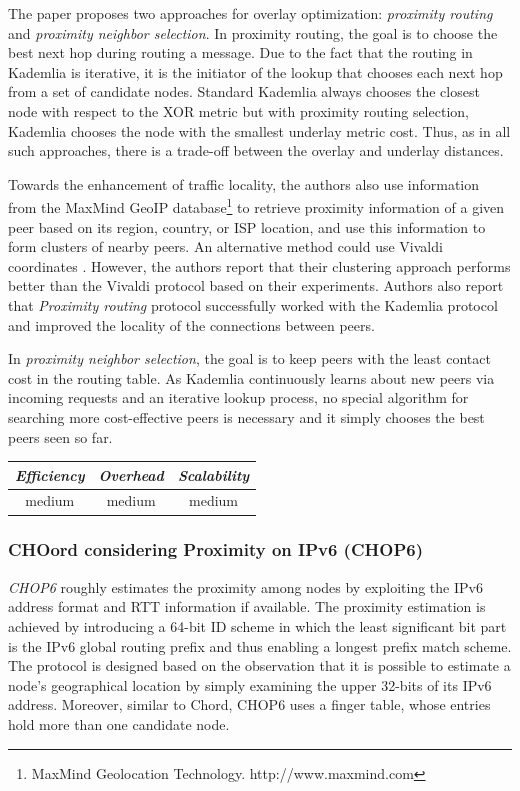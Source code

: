 The paper proposes two approaches for overlay optimization: 
{\em proximity routing} and {\em proximity neighbor selection}.
In proximity routing, the goal
is to choose the best next hop during routing a message. Due
to the fact that the routing in Kademlia is iterative, it is the initiator of
the lookup that chooses each next hop from a set of candidate nodes. Standard
Kademlia always chooses the closest node with respect to the XOR metric but with
proximity routing selection, Kademlia chooses the node with the smallest underlay
metric cost. Thus, as in all such approaches, there is a trade-off between the
overlay and underlay distances.

Towards the enhancement of traffic locality, the authors also use information
from the MaxMind GeoIP database\footnote{MaxMind Geolocation Technology.
http://www.maxmind.com} to retrieve proximity information of a given peer based
on its region, country, or ISP location, and use this information to form
clusters of nearby peers. An alternative method could use Vivaldi
coordinates \cite{cox_vivaldi_2004}. However, the authors report that their clustering
approach performs better than the Vivaldi protocol based on their experiments.
Authors also report that {\em Proximity routing} protocol successfully worked
with the Kademlia protocol and improved the locality of the connections between
peers.

In \emph{proximity neighbor selection}, the goal is to
keep peers with the least contact cost in the routing table. As Kademlia
continuously learns about new peers via incoming requests and an iterative
lookup process, no 
special algorithm for searching more cost-effective peers is necessary and
it simply chooses the best peers seen so far.

\begin{center}
\begin{tabular}{ccc}
\emph{Efficiency} & \emph{Overhead} & \emph{Scalability} \\
\hline
medium &
% 
medium &
%
medium
\end{tabular}
\end{center}

\subsubsection{CHOord considering Proximity on IPv6 (CHOP6)}
\emph{CHOP6} \cite{MT2007} roughly estimates the proximity among
nodes by exploiting the IPv6 address format and RTT information if available.
The proximity estimation is achieved by introducing a 64-bit ID scheme in which
the least significant bit part is the IPv6 global routing prefix and thus
enabling a longest prefix match scheme. The protocol is designed based on the
observation that it is possible to estimate a node's geographical location by
simply examining the upper 32-bits of its IPv6 address. Moreover, similar to
Chord\cite{stoica_chord_2001}, CHOP6 uses a finger table, whose entries hold
more than one candidate node.

